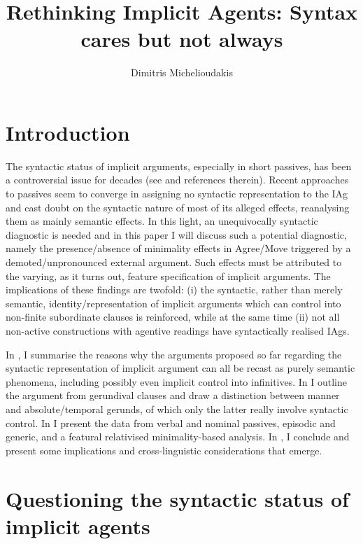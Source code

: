 \documentclass[output=paper]{langsci/langscibook}
\author{Dimitris Michelioudakis\affiliation{Aristotle University of Thessaloniki}}
\title{Rethinking Implicit Agents: Syntax cares but not always}
\begin{document}
\glsresetall
\maketitle

\section{Introduction}\label{sec:22.1}

The syntactic status of implicit arguments, especially in short
passives, has been a controversial issue for decades (see
\citealt{Roberts1985,Roberts:1987a,Jaeggli1986,Roeper1984,Williams1985,Williams1987,BhattPancheva2006}
and references therein). Recent approaches to passives
\parencite[e.g.][]{Bruening2014,Schafer2012b,AlexiadouEtAl2015} seem to converge
in assigning no syntactic representation to the \gls{IAg} and cast doubt on the
syntactic nature of most of its alleged effects, reanalysing them as mainly
semantic effects. In this light, an unequivocally syntactic diagnostic is
needed and in this paper I will discuss such a potential diagnostic, namely the
presence/absence of minimality effects in Agree/Move triggered by a
demoted/unpronounced external argument. Such effects must be attributed to the
varying, as it turns out, feature specification of implicit arguments. The
implications of these findings are twofold: (i) the syntactic, rather than
merely semantic, identity/representation of implicit arguments which can
control into non-finite subordinate clauses is reinforced, while at the same
time (ii) not all non-active constructions with agentive readings have
syntactically realised \glspl{IAg}.

In , I summarise the reasons why the arguments proposed so
far regarding the syntactic representation of implicit argument can all be recast as purely semantic phenomena, including possibly
even implicit control into infinitives. In
 I outline the argument from  gerundival clauses
and draw a distinction between manner and absolute/temporal gerunds, of which
only the latter really involve syntactic control. In  I
present the data from verbal and nominal passives, episodic and
generic, and a featural relativised minimality-based analysis. In
, I conclude and present some implications and
cross-linguistic considerations that emerge.

\section{Questioning the syntactic status of implicit
agents}\label{sec:22.2}
\end{document}
